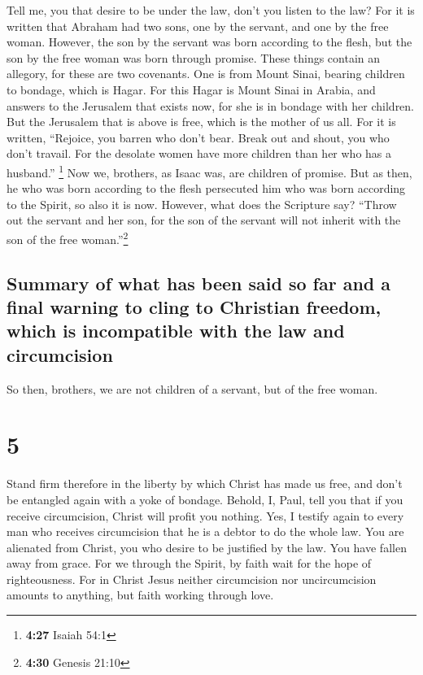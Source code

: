  Tell me, you that desire to be under the law, don't you
listen to the law?  For it is written that Abraham had
two sons, one by the servant, and one by the free woman. 
However, the son by the servant was born according to the flesh, but the
son by the free woman was born through promise.  These
things contain an allegory, for these are two covenants. One is from
Mount Sinai, bearing children to bondage, which is Hagar.
 For this Hagar is Mount Sinai in Arabia, and answers to
the Jerusalem that exists now, for she is in bondage with her children.
 But the Jerusalem that is above is free, which is the
mother of us all.  For it is written, ``Rejoice, you
barren who don't bear. Break out and shout, you who don't travail. For
the desolate women have more children than her who has a husband.''
\footnote{\textbf{4:27} Isaiah 54:1}  Now we, brothers,
as Isaac was, are children of promise.  But as then, he
who was born according to the flesh persecuted him who was born
according to the Spirit, so also it is now.  However,
what does the Scripture say? ``Throw out the servant and her son, for
the son of the servant will not inherit with the son of the free
woman.''\footnote{\textbf{4:30} Genesis 21:10}

\hypertarget{summary-of-what-has-been-said-so-far-and-a-final-warning-to-cling-to-christian-freedom-which-is-incompatible-with-the-law-and-circumcision}{%
\subsection{Summary of what has been said so far and a final warning to
cling to Christian freedom, which is incompatible with the law and
circumcision}\label{summary-of-what-has-been-said-so-far-and-a-final-warning-to-cling-to-christian-freedom-which-is-incompatible-with-the-law-and-circumcision}}

 So then, brothers, we are not children of a servant, but
of the free woman.

\hypertarget{section-4}{%
\section{5}\label{section-4}}

 Stand firm therefore in the liberty by which Christ has
made us free, and don't be entangled again with a yoke of bondage.
 Behold, I, Paul, tell you that if you receive
circumcision, Christ will profit you nothing.  Yes, I
testify again to every man who receives circumcision that he is a debtor
to do the whole law.  You are alienated from Christ, you
who desire to be justified by the law. You have fallen away from grace.
 For we through the Spirit, by faith wait for the hope of
righteousness.  For in Christ Jesus neither circumcision
nor uncircumcision amounts to anything, but faith working through love.

